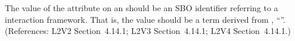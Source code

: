 The value of the  attribute on an \Event should be
an SBO identifier referring to a interaction framework.  That is, the
value should be a term derived from \sbointeractionID,
``''.  (References: L2V2 Section~4.14.1; L2V3
Section~4.14.1; L2V4 Section~4.14.1.)
